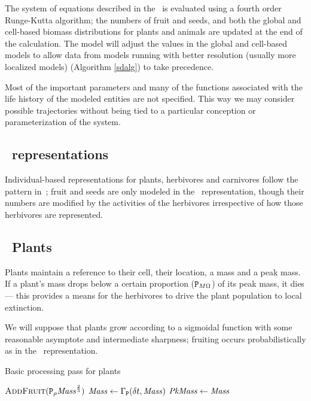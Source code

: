 
The system of equations described in the \SuppMaterial\ is evaluated
using a fourth order Runge-Kutta algorithm; the numbers of fruit and
seeds, and both the global and cell-based biomass distributions for
plants and animals are updated at the end of the calculation. The
model will adjust the values in the global and cell-based models to
allow data from models running with better resolution (usually more
localized models) (Algorithm {\ref{sdalg}}) to take precedence.

Most of the important parameters and many of the functions associated
with the life history of the modeled entities are not specified. This
way we may consider possible trajectories without being tied to a
particular conception or parameterization of the system.


\subsection*{\IB\ rep\-re\-sen\-ta\-tions}
Individual-based rep\-re\-sen\-ta\-tions for plants, herbivores and carnivores
follow the pattern in~\cite{Little2006nws}; fruit and seeds are only
modeled in the \SD\ rep\-re\-sen\-ta\-tion, though their numbers are modified
by the activities of the herbivores irrespective of how those
herbivores are represented. 

\subsection{\IB\ Plants}

Plants maintain a reference to their cell, their location, a mass and
a peak mass.  If a plant's mass drops below a certain proportion
($\texttt{P}_{M\Omega}$) of its peak mass, it dies --- this provides a
means for the herbivores to drive the plant population to local
extinction. 

We will suppose that plants grow according to a sigmoidal function with
some reasonable asymptote and intermediate sharpness; fruiting
occurs probabilistically as in the \SD\ represen\-tation.

\begin{algorithm}\label{plantalg}
  \caption{Basic processing pass for plants}
  \begin{algorithmic}
    \State $\text{\textsc{AddFruit}}(\texttt{P}_\rho \mathit{Mass}^{\frac{2}{3}})$
    \EndIf
    \State \Die
    \Else
    \State $\mathit{Mass} \gets \Gamma_{\mathtt{P}}(\delta t, \mathit{Mass})$
    \If {$\mass > \peakmass$}
    \State $\mathit{PkMass} \gets \mathit{Mass}$
    \EndIf
    \EndIf
  \end{algorithmic}
\end{algorithm}

